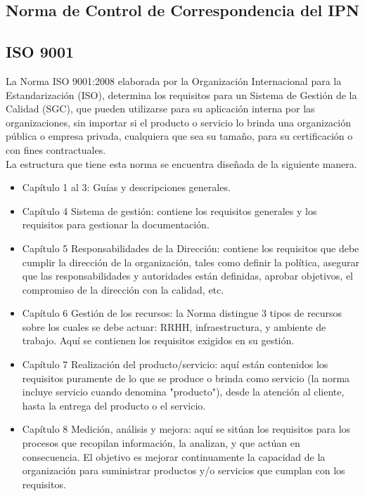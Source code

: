 	\subsection{Norma de Control de Correspondencia del IPN}
	
	\subsection{ISO 9001}
	La Norma ISO 9001:2008 elaborada por la Organización Internacional para la Estandarización (ISO), determina los requisitos para un Sistema de Gestión de la Calidad (SGC), que pueden utilizarse para su aplicación interna por las organizaciones, sin importar si el producto o servicio lo brinda una organización pública o empresa privada, cualquiera que sea su tamaño, para su certificación o con fines contractuales.\\
	
	La estructura que tiene esta norma se encuentra diseñada de la siguiente manera.\\
	
	\begin{itemize}
		\item Capítulo 1 al 3: Guías y descripciones generales.
		\item Capítulo 4 Sistema de gestión: contiene los requisitos generales y los requisitos para gestionar la documentación.
		\item Capítulo 5 Responsabilidades de la Dirección: contiene los requisitos que debe cumplir la dirección de la organización, tales como definir la política, asegurar que las responsabilidades y autoridades están definidas, aprobar objetivos, el compromiso de la dirección con la calidad, etc.
		\item Capítulo 6 Gestión de los recursos: la Norma distingue 3 tipos de recursos sobre los cuales se debe actuar: RRHH, infraestructura, y ambiente de trabajo. Aquí se contienen los requisitos exigidos en su gestión.
		\item Capítulo 7 Realización del producto/servicio: aquí están contenidos los requisitos puramente de lo que se produce o brinda como servicio (la norma incluye servicio cuando denomina "producto"), desde la atención al cliente, hasta la entrega del producto o el servicio.
		\item Capítulo 8 Medición, análisis y mejora: aquí se sitúan los requisitos para los procesos que recopilan información, la analizan, y que actúan en consecuencia. El objetivo es mejorar continuamente la capacidad de la organización para suministrar productos y/o servicios que cumplan con los requisitos.
	\end{itemize}
	
